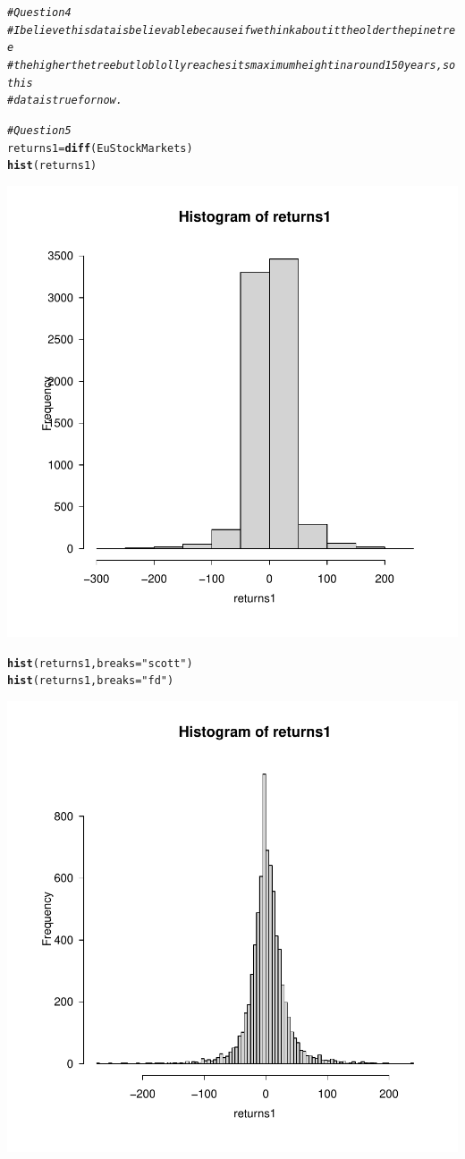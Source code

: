 \documentclass{article}\usepackage[]{graphicx}\usepackage[]{xcolor}
\makeatletter
\newcommand{\hlstr}[1]{\textcolor[rgb]{0.192,0.494,0.8}{#1}}%
\newcommand{\hlcom}[1]{\textcolor[rgb]{0.678,0.584,0.686}{\textit{#1}}}%
\newcommand{\hlstd}[1]{\textcolor[rgb]{0.345,0.345,0.345}{#1}}%
\newcommand{\hlkwb}[1]{\textcolor[rgb]{0.69,0.353,0.396}{#1}}%
\newcommand{\hlkwc}[1]{\textcolor[rgb]{0.333,0.667,0.333}{#1}}%
\newcommand{\hlkwd}[1]{\textcolor[rgb]{0.737,0.353,0.396}{\textbf{#1}}}%
\newenvironment{kframe}{%
 \def\at@end@of@kframe{}%
 \ifinner\ifhmode%
  \def\at@end@of@kframe{\end{minipage}}%
  \begin{minipage}{\columnwidth}%
 \fi\fi%
 \def\FrameCommand##1{\hskip\@totalleftmargin \hskip-\fboxsep
 \colorbox{shadecolor}{##1}\hskip-\fboxsep
     \hskip-\linewidth \hskip-\@totalleftmargin \hskip\columnwidth}%
 \MakeFramed {\advance\hsize-\width
   \@totalleftmargin\z@ \linewidth\hsize
   \@setminipage}}%
 {\par\unskip\endMakeFramed%
 \at@end@of@kframe}
\newenvironment{knitrout}{}{} %
\makeatother
\begin{document}
\begin{knitrout}
{}


\begin{kframe}\begin{alltt}
\hlcom{#Question 4}
\hlcom{# I believe this data is believable because if we think about it the older the pine tree}
\hlcom{# the higher the tree but loblolly reaches its maximum height in around 150 years, so this}
\hlcom{# data is true for now.}

\hlcom{#Question 5}
\hlstd{returns1} \hlkwb{=} \hlkwd{diff}\hlstd{(EuStockMarkets)}
\hlkwd{hist}\hlstd{(returns1)}
\end{alltt}
\end{kframe}

{\centering \includegraphics[width=.6\linewidth]{figure/Meng51940633A3-Rnwauto-report-5} 

}


\begin{kframe}\begin{alltt}
\hlkwd{hist}\hlstd{(returns1,} \hlkwc{breaks} \hlstd{=} \hlstr{"scott"}\hlstd{)}
\hlkwd{hist}\hlstd{(returns1,} \hlkwc{breaks} \hlstd{=} \hlstr{"fd"}\hlstd{)}
\end{alltt}
\end{kframe}

{\centering \includegraphics[width=.6\linewidth]{figure/Meng51940633A3-Rnwauto-report-6} 

}
\end{knitrout}
\end{document}
